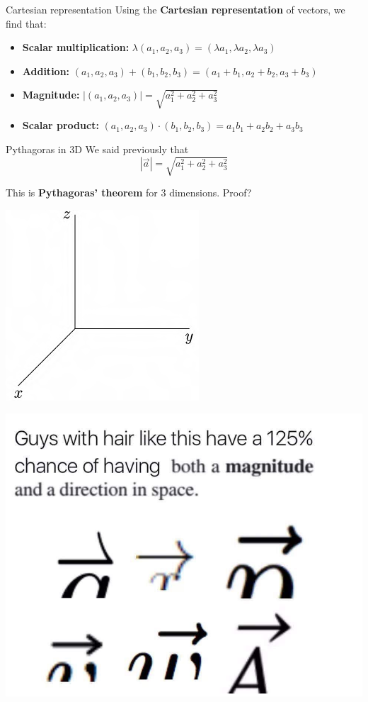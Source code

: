 \documentclass{beamer}
\begin{document}
\begin{frame}{Cartesian representation}
	Using the \textbf{Cartesian representation} of vectors, we find that:
	\begin{itemize}
		\item \textbf{Scalar multiplication: } $\lambda(a_1, a_2, a_3) = (\lambda a_1, \lambda a_2, \lambda a_3)$
		\item \textbf{Addition: } $(a_1, a_2, a_3) + (b_1, b_2, b_3) = (a_1 + b_1, a_2 + b_2, a_3 + b_3)$
		\item \textbf{Magnitude: } $|(a_1, a_2, a_3)| = \sqrt{a_1^2 + a_2^2 + a_3^2}$
		\item \textbf{Scalar product: } $(a_1, a_2, a_3)\cdot(b_1, b_2, b_3) = a_1b_1 + a_2b_2 + a_3b_3$
	\end{itemize}
\end{frame}

\begin{frame}{Pythagoras in 3D}
	We said previously that
	$$|\vec{a}| = \sqrt{a_1^2 + a_2^2 + a_3^2}$$
	
	This is \textbf{Pythagoras' theorem} for 3 dimensions. Proof?
	\begin{center}
		\includegraphics[scale = 0.5]{img/axes.png}
	\end{center}
\end{frame}

\begin{frame}
	\includegraphics[width = \linewidth]{img/vector_meme.jpg}
\end{frame}
\end{document}
